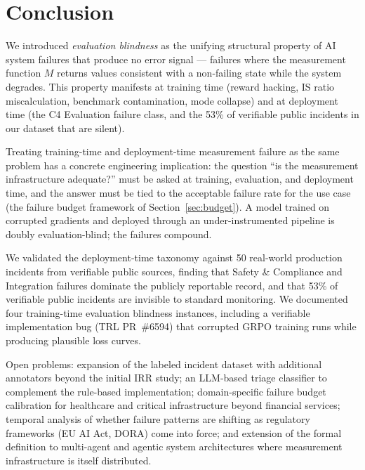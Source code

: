 \documentclass{article}
\begin{document}
\section{Conclusion}
\label{sec:conclusion}

We introduced \emph{evaluation blindness} as the unifying structural property
of AI system failures that produce no error signal --- failures where the
measurement function $M$ returns values consistent with a non-failing state
while the system degrades.  This property manifests at training time (reward
hacking, IS ratio miscalculation, benchmark contamination, mode collapse) and
at deployment time (the C4 Evaluation failure class, and the 53\% of
verifiable public incidents in our dataset that are silent).

Treating training-time and deployment-time measurement failure as the same
problem has a concrete engineering implication: the question ``is the
measurement infrastructure adequate?'' must be asked at training, evaluation,
and deployment time, and the answer must be tied to the acceptable failure
rate for the use case (the failure budget framework of Section~\ref{sec:budget}).
A model trained on corrupted gradients and deployed through an under-instrumented
pipeline is doubly evaluation-blind; the failures compound.

We validated the deployment-time taxonomy against 50 real-world production
incidents from verifiable public sources, finding that Safety \& Compliance
and Integration failures dominate the publicly reportable record, and that
53\% of verifiable public incidents are invisible to standard monitoring.  We documented four
training-time evaluation blindness instances, including a verifiable
implementation bug (TRL PR~\#6594) that corrupted GRPO training runs while
producing plausible loss curves.

Open problems: expansion of the labeled incident dataset with additional
annotators beyond the initial IRR study;
an LLM-based triage classifier to complement the rule-based implementation;
domain-specific failure budget calibration for healthcare and critical
infrastructure beyond financial services; temporal analysis of whether failure
patterns are shifting as regulatory frameworks (EU AI Act, DORA) come into
force; and extension of the formal definition to multi-agent and agentic
system architectures where measurement infrastructure is itself distributed.
\end{document}
